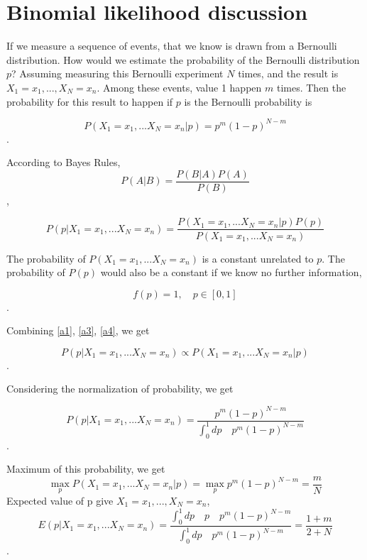 
\chapter{Binomial likelihood discussion}
If we measure a sequence of events, that we know is drawn from a Bernoulli distribution. 
How would we estimate the probability of the Bernoulli distribution $p$?
Assuming measuring this Bernoulli experiment $N$ times, and the result is ${X_1=x_1, ..., X_N=x_n}$. 
Among these events, value 1 happen $m$ times. 
Then the probability for this result to happen if $p$ is the Bernoulli probability is

\begin{equation}
P(X_1=x_1, ... X_N=x_n|p)=p^m(1-p)^{N-m}
\label{a1}
\end{equation}.

According to Bayes Rules,
\begin{equation}
P(A|B)=\frac{P(B|A)P(A)}{P(B)}
\label{a2}
\end{equation},

\begin{equation}
P(p|X_1=x_1, ... X_N=x_n)=\frac{P(X_1=x_1, ... X_N=x_n|p)P(p)}{P(X_1=x_1, ... X_N=x_n)}
\label{a3}
\end{equation}

The probability of $P(X_1=x_1, ... X_N=x_n)$ is a constant unrelated to $p$.
The probability of $P(p)$ would also be a constant if we know no further information,

\begin{equation}
f(p)=1,\quad p \in[0,1]
\label{a4}
\end{equation}.

Combining \ref{a1}, \ref{a3}, \ref{a4}, we get

\begin{equation}
P(p|X_1=x_1, ... X_N=x_n) \propto  P(X_1=x_1, ... X_N=x_n|p)
\label{a5}
\end{equation}.

Considering the normalization of probability, we get

\begin{equation}
P(p|X_1=x_1, ... X_N=x_n) =\frac{p^m(1-p)^{N-m}}{\int_0^1 dp\quad p^m(1-p)^{N-m}}
\label{a6}
\end{equation}.

Maximum of this probability, we get
\begin{equation}
\max_p P(X_1=x_1, ... X_N=x_n|p) = 
\max_p p^m(1-p)^{N-m} =\frac{m}{N}
\label{a7}
\end{equation}
Expected value of p give ${X_1=x_1, ..., X_N=x_n}$,
\begin{equation}
E(p|X_1=x_1, ... X_N=x_n) =\frac{\int_0^1 dp\quad p\quad p^m(1-p)^{N-m}}{\int_0^1 dp\quad p^m(1-p)^{N-m}}
=\frac{1+m}{2+N}
\label{a8}
\end{equation}.

